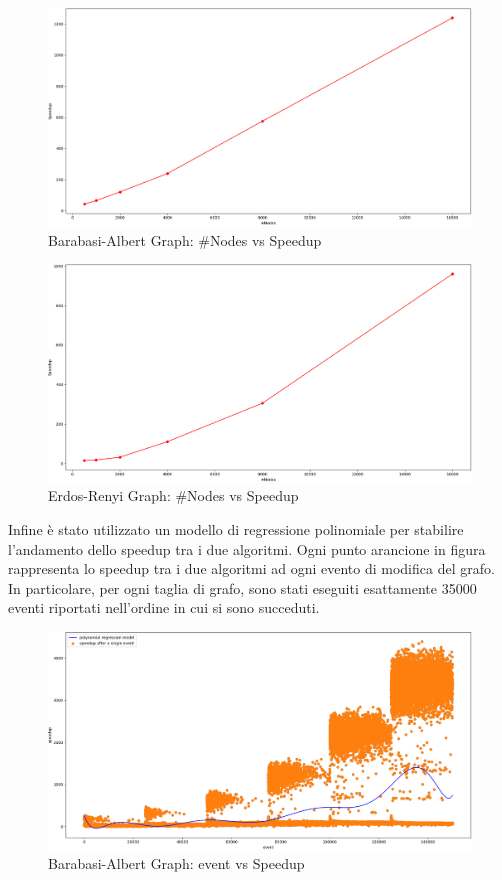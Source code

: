 \documentclass[a4paper]{article}
\begin{document}
\begin{figure}[!h]
\includegraphics[scale=0.29]{img/BAG_F2_Nodes-Speedup}
\centering
\caption{Barabasi-Albert Graph: \#Nodes vs Speedup}
\end{figure}
\begin{figure}[!h]
\includegraphics[scale=0.29]{img/ERG_F2_Nodes-Speedup}
\centering
\caption{Erdos-Renyi Graph: \#Nodes vs Speedup}
\end{figure}
\newpage
Infine è stato utilizzato un modello di regressione polinomiale per stabilire l'andamento dello speedup tra i due algoritmi. Ogni punto arancione in figura rappresenta lo speedup tra i due algoritmi ad ogni evento di modifica del grafo. In particolare, per ogni taglia di grafo, sono stati eseguiti esattamente 35000 eventi riportati nell'ordine in cui si sono succeduti. 
\begin{figure}[!h]
\includegraphics[scale=0.29]{img/BAG_F3_Event-Speedup}
\centering
\caption{Barabasi-Albert Graph: event vs Speedup}
\end{figure}
\end{document}

